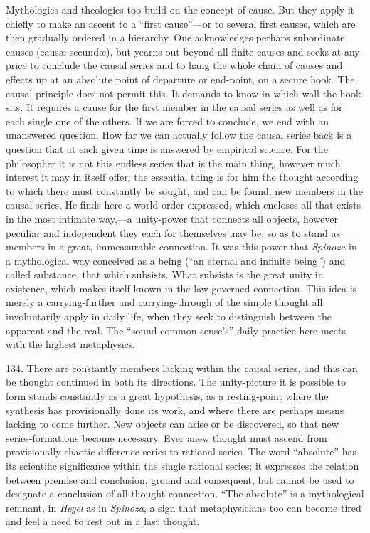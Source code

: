 \documentclass[12pt,a4paper]{book}
\newcommand{\opage}[1]{\marginnote{\footnotesize\textit{[#1]}}}
\begin{document}
Mythologies and theologies too build on the concept of cause. But they apply it chiefly to make an
ascent to a ``first cause''---or to several first causes, which are then gradually ordered in a
hierarchy. One acknowledges perhaps subordinate causes (causæ secundæ), but yearns out beyond all
finite causes and seeks at any price to conclude the causal series and to hang the whole chain of
causes and effects up at an absolute point of departure or end-point, on a secure hook. The causal
principle does not permit this. It demands to know in which wall the hook sits. It requires a cause
for the first member in the causal series as well as for each single one of the others. If we are
forced to conclude, we end with an unanswered question. How far we can actually follow the causal
series back is a question that at each given time is answered by empirical science. For the
philosopher it is not this endless series that is the main thing, \opage{321}however much interest it may in
itself offer; the essential thing is for him the thought according to which there must constantly be
sought, and can be found, new members in the causal series. He finds here a world-order expressed,
which encloses all that exists in the most intimate way,---a unity-power that connects all objects,
however peculiar and independent they each for themselves may be, so as to stand as members in a
great, immeasurable connection. It was this power that \emph{Spinoza} in a mythological way
conceived as a being (``an eternal and infinite being'') and called substance, that which subsists.
What subsists is the great unity in existence, which makes itself known in the law-governed
connection. This idea is merely a carrying-further and carrying-through of the simple thought all
involuntarily apply in daily life, when they seek to distinguish between the apparent and the real.
The ``sound common sense's'' daily practice here meets with the highest metaphysics.

134. There are constantly members lacking within the causal series, and this can be thought
continued in both its directions. The unity-picture it is possible to form stands constantly as a
great hypothesis, as a resting-point where the synthesis has provisionally done its work, and where
there are perhaps means lacking to come further. New objects can arise or be discovered, so that new
series-formations become necessary. Ever anew thought must ascend from provisionally chaotic
difference-series to rational series. The word ``absolute'' has its scientific significance within
the single rational series; it expresses the relation between premise and conclusion, ground and
consequent, but cannot be used to designate a conclusion of all thought-connection. ``The absolute''
is a mythological remnant, in \emph{Hegel} as in \emph{Spinoza}, a sign that metaphysicians too can
become tired and feel a need to rest out in a last thought.
\end{document}
